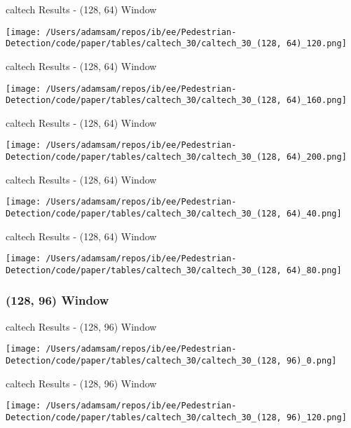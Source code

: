 \begin{table}
    \caption{caltech Results - (128, 64) Window}
    \texttt{[image: /Users/adamsam/repos/ib/ee/Pedestrian-Detection/code/paper/tables/caltech\_30/caltech\_30\_(128, 64)\_120.png]}
    \label{tab:caltech_30_(128, 64)_120}
\end{table}

\begin{table}
    \caption{caltech Results - (128, 64) Window}
    \texttt{[image: /Users/adamsam/repos/ib/ee/Pedestrian-Detection/code/paper/tables/caltech\_30/caltech\_30\_(128, 64)\_160.png]}
    \label{tab:caltech_30_(128, 64)_160}
\end{table}

\begin{table}
    \caption{caltech Results - (128, 64) Window}
    \texttt{[image: /Users/adamsam/repos/ib/ee/Pedestrian-Detection/code/paper/tables/caltech\_30/caltech\_30\_(128, 64)\_200.png]}
    \label{tab:caltech_30_(128, 64)_200}
\end{table}

\begin{table}
    \caption{caltech Results - (128, 64) Window}
    \texttt{[image: /Users/adamsam/repos/ib/ee/Pedestrian-Detection/code/paper/tables/caltech\_30/caltech\_30\_(128, 64)\_40.png]}
    \label{tab:caltech_30_(128, 64)_40}
\end{table}

\begin{table}
    \caption{caltech Results - (128, 64) Window}
    \texttt{[image: /Users/adamsam/repos/ib/ee/Pedestrian-Detection/code/paper/tables/caltech\_30/caltech\_30\_(128, 64)\_80.png]}
    \label{tab:caltech_30_(128, 64)_80}
\end{table}

\subsubsection*{(128, 96) Window}

\begin{table}
    \caption{caltech Results - (128, 96) Window}
    \texttt{[image: /Users/adamsam/repos/ib/ee/Pedestrian-Detection/code/paper/tables/caltech\_30/caltech\_30\_(128, 96)\_0.png]}
    \label{tab:caltech_30_(128, 96)_0}
\end{table}

\begin{table}
    \caption{caltech Results - (128, 96) Window}
    \texttt{[image: /Users/adamsam/repos/ib/ee/Pedestrian-Detection/code/paper/tables/caltech\_30/caltech\_30\_(128, 96)\_120.png]}
    \label{tab:caltech_30_(128, 96)_120}
\end{table}

